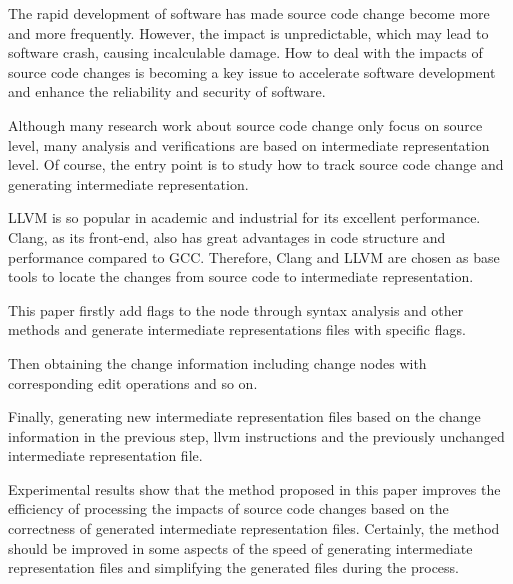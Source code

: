 \begin{englishabstract}

The rapid development of software has made source code change become more and more frequently. However, the impact  is unpredictable, which may lead to software crash, causing incalculable damage. How to deal with the impacts of source code changes is becoming a key issue to accelerate software development and enhance the reliability and security of software.

Although many research work about source code change only focus on source level, many analysis and verifications are based on intermediate representation level. Of course, the entry point is to study how to track source code change and generating intermediate representation. 

LLVM is so popular in academic and industrial for its excellent performance. Clang, as its front-end, also has great advantages in code structure and performance compared to GCC. Therefore, Clang and LLVM are chosen as base tools to locate the changes from source code to intermediate representation.

This paper firstly add flags to the node through syntax analysis and other methods and generate intermediate representations files with specific flags.

Then obtaining the change information including change nodes with corresponding edit operations and so on.

Finally, generating new intermediate representation files based on the change information in the previous step, llvm instructions and the previously unchanged intermediate representation file.

Experimental results show that the method proposed in this paper improves the efficiency of processing the impacts of source code changes based on the correctness of generated intermediate representation files. Certainly, the method should be improved in some aspects of the speed of generating intermediate representation files and simplifying the generated files during the process.

\end{englishabstract}

